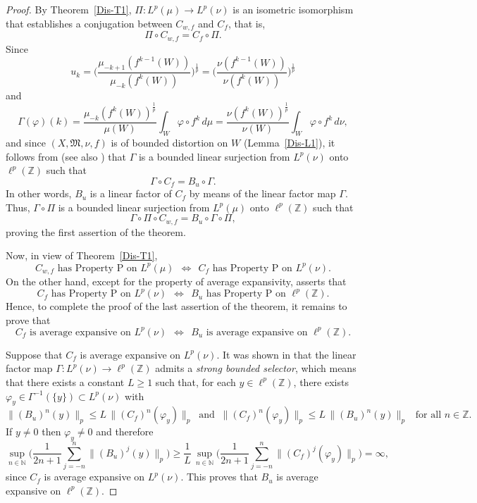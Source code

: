 \documentclass[12pt]{article}
\theoremstyle{plain}
\theoremstyle{definition}
\newcommand{\N}{\mathbb{N}} %
\newcommand{\Z}{\mathbb{Z}} %
\newcommand{\fM}{\mathfrak{M}}
\begin{document}
\begin{proof}
By Theorem~\ref{Dis-T1}, $\Pi : L^p(\mu) \to L^p(\nu)$ is an isometric isomorphism that 
establishes a conjugation between $C_{w,f}$ and $C_f$, that is,
\[
\Pi \circ C_{w,f} = C_f \circ \Pi.
\]
Since
\[
u_k = \Big(\frac{\mu_{-k+1}(f^{k-1}(W))}{\mu_{-k}(f^k(W))}\Big)^\frac{1}{p}  = \Big(\frac{\nu(f^{k-1}(W))}{\nu(f^k(W))}\Big)^\frac{1}{p}
\]
and 
\[
\Gamma(\varphi)(k) = \frac{\mu_{-k}(f^k(W))^\frac{1}{p}}{\mu(W)} \int_W \varphi \circ f^k\, d\mu
  = \frac{\nu(f^k(W))^\frac{1}{p}}{\nu(W)} \int_W \varphi \circ f^k\, d\nu,
\]
and since $(X,\fM,\nu,f)$ is of bounded distortion on $W$ (Lemma~\ref{Dis-L1}), it follows from \cite[Lemma~4.2.3]{AniDarMai21} 
(see also \cite{AniDarMai22}) that $\Gamma$ is a bounded linear surjection from $L^p(\nu)$ onto $\ell^p(\Z)$ such that
\[
\Gamma \circ C_f = B_u \circ \Gamma.
\]
In other words, $B_u$ is a linear factor of $C_f$ by means of the linear factor map $\Gamma$.
Thus, $\Gamma \circ \Pi$ is a bounded linear surjection from $L^p(\mu)$ onto $\ell^p(\Z)$ such that
\[
\Gamma \circ \Pi \circ C_{w,f} = B_u \circ \Gamma \circ \Pi,
\]
proving the first assertion of the theorem.

Now, in view of Theorem~\ref{Dis-T1}, 
\[
C_{w,f} \text{ has Property P on } L^p(\mu) \ \ \Longleftrightarrow \ \ C_f \text{ has Property P on } L^p(\nu).
\]
On the other hand, except for the property of average expansivity, \cite[Theorem~M]{AniDarMai22} asserts that
\[
C_f \text{ has Property P on } L^p(\nu) \ \ \Longleftrightarrow \ \ B_u \text{ has Property P on } \ell^p(\Z).
\]
Hence, to complete the proof of the last assertion of the theorem, it remains to prove that
\[
C_f \text{ is average expansive on } L^p(\nu) \ \ \Longleftrightarrow \ \ B_u \text{ is average expansive on } \ell^p(\Z).
\]

Suppose that $C_f$ is average expansive on $L^p(\nu)$.
It was shown in \cite[Lemma~3.4]{AniDarMai22} that the linear factor map $\Gamma : L^p(\nu) \to \ell^p(\Z)$ 
admits a {\em strong bounded selector}, which means that there exists a constant $L \geq 1$ such that,
for each $y \in \ell^p(\Z)$, there exists $\varphi_y \in \Gamma^{-1}(\{y\}) \subset L^p(\nu)$ with
\[
\|(B_u)^n(y)\|_p \leq L\, \|(C_f)^n(\varphi_y)\|_p \ \text{ and } \ \|(C_f)^n(\varphi_y)\|_p \leq L\, \|(B_u)^n(y)\|_p \ \ \text{ for all } n \in \Z.
\]
If $y \neq 0$ then $\varphi_y \neq 0$ and therefore
\[
\sup_{n \in \N} \Big(\frac{1}{2n+1} \sum_{j=-n}^n \|(B_u)^j(y)\|_p\Big) 
  \geq \frac{1}{L}\, \sup_{n \in \N} \Big(\frac{1}{2n+1} \sum_{j=-n}^n \|(C_f)^j(\varphi_y)\|_p\Big) = \infty,
\]
since $C_f$ is average expansive on $L^p(\nu)$. This proves that $B_u$ is average expansive on $\ell^p(\Z)$.


\end{proof}
\end{document}
